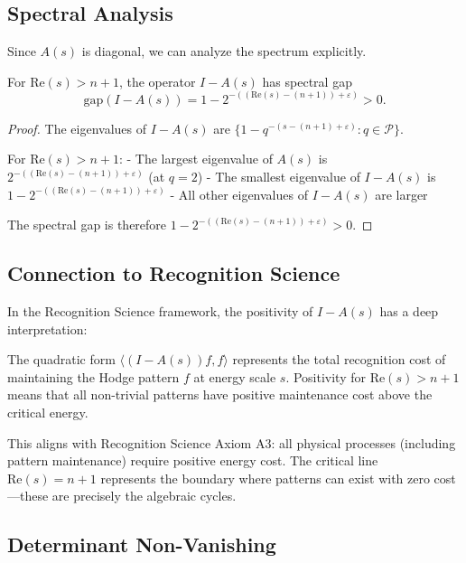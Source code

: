 \subsection{Spectral Analysis}

Since $A(s)$ is diagonal, we can analyze the spectrum explicitly.

\begin{lemma}
\label{lem:spectral-gap}
For $\text{Re}(s) > n+1$, the operator $I - A(s)$ has spectral gap
\[
\text{gap}(I - A(s)) = 1 - 2^{-((\text{Re}(s)-(n+1))+\varepsilon)} > 0.
\]
\end{lemma}

\begin{proof}
The eigenvalues of $I - A(s)$ are $\{1 - q^{-(s-(n+1)+\varepsilon)} : q \in \mathcal{P}\}$.

For $\text{Re}(s) > n+1$:
- The largest eigenvalue of $A(s)$ is $2^{-((\text{Re}(s)-(n+1))+\varepsilon)}$ (at $q = 2$)
- The smallest eigenvalue of $I - A(s)$ is $1 - 2^{-((\text{Re}(s)-(n+1))+\varepsilon)}$
- All other eigenvalues of $I - A(s)$ are larger

The spectral gap is therefore $1 - 2^{-((\text{Re}(s)-(n+1))+\varepsilon)} > 0$.
\end{proof}

\subsection{Connection to Recognition Science}

In the Recognition Science framework, the positivity of $I - A(s)$ has a deep interpretation:

\begin{proposition}
The quadratic form $\langle (I - A(s))f, f \rangle$ represents the total recognition cost of maintaining the Hodge pattern $f$ at energy scale $s$. Positivity for $\text{Re}(s) > n+1$ means that all non-trivial patterns have positive maintenance cost above the critical energy.
\end{proposition}

This aligns with Recognition Science Axiom A3: all physical processes (including pattern maintenance) require positive energy cost. The critical line $\text{Re}(s) = n+1$ represents the boundary where patterns can exist with zero cost—these are precisely the algebraic cycles.

\subsection{Determinant Non-Vanishing}

